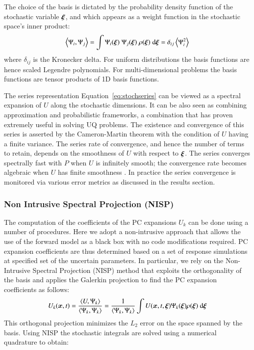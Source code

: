 The choice of the basis is dictated by the probability density
function of the stochastic variable $\xxi$, and which appears as a weight
function in the stochastic space's inner product:
\begin{equation}
 \left<\Psi_i,\Psi_j\right> = \int \Psi_i(\xxi) \;\Psi_j(\xxi) \; \rho(\xxi) \; \mbox{d}\xxi=\delta_{ij}\ave{\Psi_i^2}
\label{eq:inner}
\end{equation}
where $\delta_{ij}$ is the Kronecker delta.
For uniform
distributions the basis functions are hence scaled Legendre polynomials.
For multi-dimensional problems the basis functions are
tensor products of 1D basis functions.

The series representation Equation~\eqref{eq:stochseries} can be viewed as a spectral expansion
of $U$ along the stochastic dimensions. It can be also seen as
combining approximation and probabilistic frameworks, a combination
that has proven extremely useful in solving UQ problems. The existence and convergence of this series
is asserted by the Cameron-Martin theorem \citep{Cameron:1947} with the condition of $U$ having a finite variance.
The series rate of convergence, and hence the number of terms to retain, depends on the smoothness of
$U$ with respect to $\xxi$. The series converges spectrally fast with $P$
when $U$ is infinitely smooth; the convergence rate becomes algebraic
when $U$ has finite smoothness \citep{Canuto:2006}. In practice the series convergence is monitored 
via various error metrics as discussed in the results section.

\subsubsection{Non Intrusive Spectral Projection (NISP)}
The computation of the coefficients of the PC expansions $U_k$
can be done using a number of procedures. Here we adopt a non-intrusive
approach that allows the use of the forward model \geoclaw as a black box
with no code modifications required. PC expansion coefficients are thus determined
based on a set of response \geoclaw simulations at specified set of the uncertain parameters. 
In particular, we rely on the Non-Intrusive Spectral Projection (NISP) method that exploits the orthogonality of the basis and applies the Galerkin projection to find the PC expansion coefficients as follows:
\begin{equation}
 U_k(\bm{x},t) = \frac{\left< U, \Psi_k \right>}{\left< \Psi_k, \Psi_k \right>} = 
 \frac{1}{\left< \Psi_k, \Psi_k \right>} 
 \int U(\bm{x},t,\xxi) \Psi_k(\xxi) \rho(\xxi) \mbox{ d}\xxi
\end{equation}
This orthogonal projection minimizes the $L_2$ error on the space spanned by the basis.
Using NISP the stochastic integrals are solved using a numerical quadrature to obtain:

